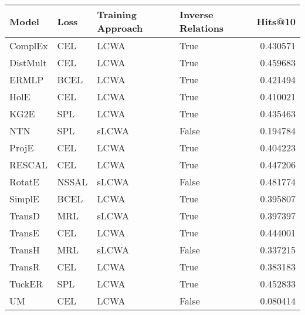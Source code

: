 \begin{tabular}{llllr}
\toprule
    Model &   Loss & Training Approach & Inverse Relations &   Hits@10 \\
\midrule
  ComplEx &    CEL &              LCWA &              True &  0.430571 \\
 DistMult &    CEL &              LCWA &              True &  0.459683 \\
    ERMLP &   BCEL &              LCWA &              True &  0.421494 \\
     HolE &    CEL &              LCWA &              True &  0.410021 \\
     KG2E &    SPL &              LCWA &              True &  0.435463 \\
      NTN &    SPL &             sLCWA &             False &  0.194784 \\
    ProjE &    CEL &              LCWA &              True &  0.404223 \\
   RESCAL &    CEL &              LCWA &              True &  0.447206 \\
   RotatE &  NSSAL &             sLCWA &             False &  0.481774 \\
   SimplE &   BCEL &              LCWA &              True &  0.395807 \\
   TransD &    MRL &             sLCWA &              True &  0.397397 \\
   TransE &    CEL &              LCWA &              True &  0.444001 \\
   TransH &    MRL &             sLCWA &             False &  0.337215 \\
   TransR &    CEL &              LCWA &              True &  0.383183 \\
   TuckER &    SPL &              LCWA &              True &  0.452833 \\
       UM &    CEL &              LCWA &             False &  0.080414 \\
\bottomrule
\end{tabular}

